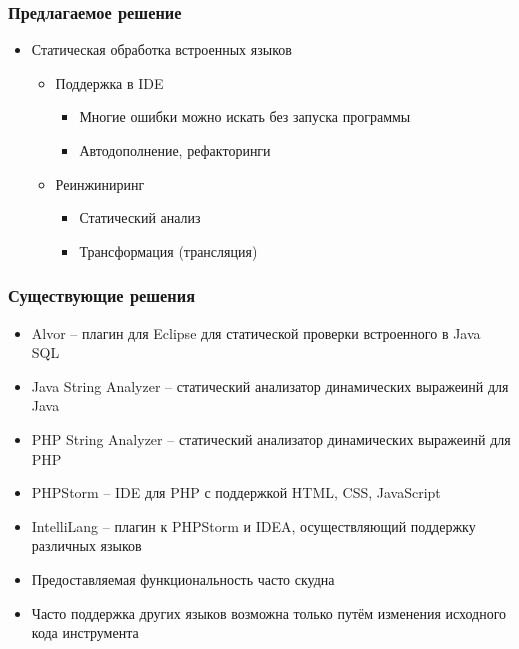 \documentclass{beamer}
\begin{document}
\begin{frame}[fragile]
	\transwipe[direction=90]
	\frametitle{Предлагаемое решение}
	\begin{itemize}
	    \item Статическая обработка встроенных языков
	    \begin{itemize}
		    \item Поддержка в IDE
        	\begin{itemize}
        		\item Многие ошибки можно искать без запуска программы
            	\item Автодополнение, рефакторинги
            \end{itemize}
	        \item Реинжиниринг
        	\begin{itemize}
        		\item Статический анализ
            	\item Трансформация (трансляция)
            \end{itemize}
	    \end{itemize}
    \end{itemize}
\end{frame}


\begin{frame}[fragile]
	\transwipe[direction=90]
	\frametitle{Существующие решения}
	\begin{itemize}
	    \item Alvor -- плагин для Eclipse для статической проверки встроенного в Java SQL
	    \item Java String Analyzer -- статический анализатор динамических выражеинй для Java
		\item PHP String Analyzer -- статический анализатор динамических выражеинй для PHP
        \item PHPStorm -- IDE для PHP с поддержкой HTML, CSS, JavaScript
        \item IntelliLang -- плагин к PHPStorm и IDEA, осуществляющий поддержку различных языков
    \end{itemize}
    \begin{itemize}
        \item Предоставляемая функциональность часто скудна
	    \item Часто поддержка других языков возможна только путём изменения исходного кода инструмента
    \end{itemize}
\end{frame}
\end{document}
